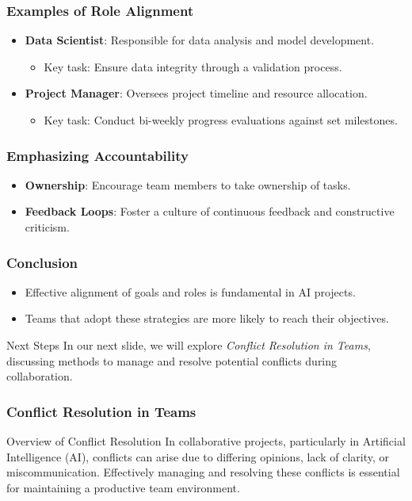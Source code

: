 \documentclass[aspectratio=169]{beamer}
\begin{document}
\begin{frame}[fragile]
    \frametitle{Examples of Role Alignment}
    \begin{itemize}
        \item \textbf{Data Scientist}: Responsible for data analysis and model development. 
              \begin{itemize}
                  \item Key task: Ensure data integrity through a validation process.
              \end{itemize}
        \item \textbf{Project Manager}: Oversees project timeline and resource allocation.
              \begin{itemize}
                  \item Key task: Conduct bi-weekly progress evaluations against set milestones.
              \end{itemize}
    \end{itemize}
\end{frame}

\begin{frame}[fragile]
    \frametitle{Emphasizing Accountability}
    \begin{itemize}
        \item \textbf{Ownership}: Encourage team members to take ownership of tasks.
        \item \textbf{Feedback Loops}: Foster a culture of continuous feedback and constructive criticism.
    \end{itemize}
\end{frame}

\begin{frame}[fragile]
    \frametitle{Conclusion}
    \begin{itemize}
        \item Effective alignment of goals and roles is fundamental in AI projects.
        \item Teams that adopt these strategies are more likely to reach their objectives.
    \end{itemize}
    \begin{block}{Next Steps}
        In our next slide, we will explore \textit{Conflict Resolution in Teams}, discussing methods to manage and resolve potential conflicts during collaboration.
    \end{block}
\end{frame}

\begin{frame}[fragile]
    \frametitle{Conflict Resolution in Teams}
    \begin{block}{Overview of Conflict Resolution}
        In collaborative projects, particularly in Artificial Intelligence (AI), conflicts can arise due to differing opinions, lack of clarity, or miscommunication. Effectively managing and resolving these conflicts is essential for maintaining a productive team environment. 
    \end{block}
\end{frame}
\end{document}
